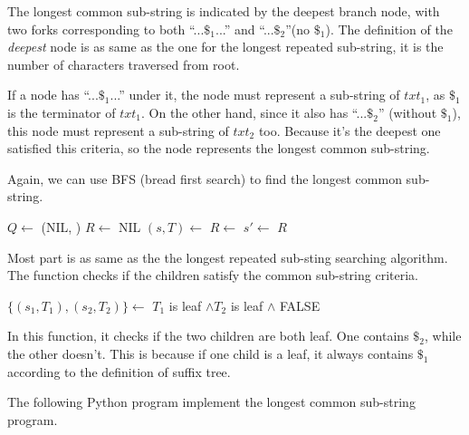 \documentclass[UTF8]{article}
\begin{document}
The longest common sub-string is indicated by the deepest branch node, with
two forks corresponding to both ``...$\$_1$...'' and ``...$\$_2$''(no $\$_1$).
The definition of the {\em deepest} node is as same as the one for
the longest repeated sub-string, it is the number of characters traversed
from root.

If a node has ``...$\$_1$...'' under it, the node must represent
a sub-string of $txt_1$, as $\$_1$ is the terminator of $txt_1$.
On the other hand, since it also has ``...$\$_2$'' (without $\$_1$), this node
must represent a sub-string of $txt_2$ too. Because it's the deepest
one satisfied this criteria, so the node represents the longest common
sub-string.

Again, we can use BFS (bread first search) to find the longest common sub-string.

\begin{algorithmic}[1]
  \State $Q \gets$ (NIL, )
  \State $R \gets$ NIL
    \State $(s, T) \gets$ 
      \State $R \gets$ 
    \EndIf
        \State $s' \gets$ 
        \State {}
      \EndIf
    \EndFor
  \EndWhile
  \State \Return $R$
\EndFunction
\end{algorithmic}

Most part is as same as the the longest repeated sub-sting searching algorithm.
The function  checks if the children satisfy the common sub-string criteria.

\begin{algorithmic}[1]
    \State $\{(s_1, T_1), (s_2, T_2)\} \gets$ 
    \State \Return $T_1$ is leaf $\land T_2$ is leaf $\land$ 
  \EndIf
  \State \Return FALSE
\EndFunction
\end{algorithmic}

In this function, it checks if the two children
are both leaf. One contains $\$_2$, while the
other doesn't. This is because
if one child is a leaf, it always contains $\$_1$
according to the definition of suffix tree.

The following Python program implement the longest common sub-string program.
\end{document}
